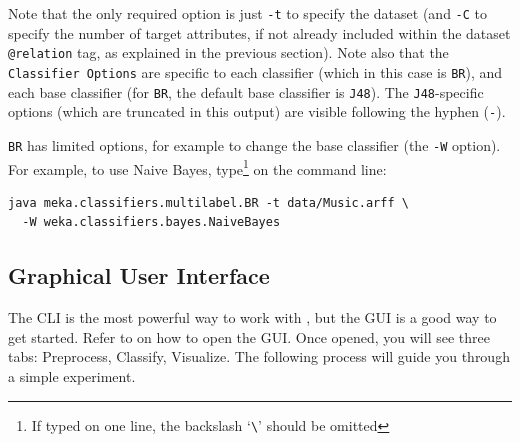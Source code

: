 \documentclass[11pt]{article}
\newcommand{\MEKA}{Meka}
\begin{document}
\begin{center}

\end{center}

Note that the only required option is just \texttt{-t} to specify the dataset (and \texttt{-C} to specify the number of target attributes, if not already included within the dataset \texttt{@relation} tag, as explained in the previous section). Note also that the \texttt{Classifier Options} are specific to each classifier (which in this case is \texttt{BR}), and each base classifier (for \texttt{BR}, the default base classifier is \texttt{J48}). The \texttt{J48}-specific options (which are truncated in this output) are visible following the hyphen (\texttt{-}). 

\texttt{BR} has limited options, for example to change the base classifier (the \texttt{-W} option). For example, to use Naive Bayes, type\footnote{If typed on one line, the backslash `\texttt{\textbackslash}' should be omitted} on the command line:

\begin{lstlisting}
java meka.classifiers.multilabel.BR -t data/Music.arff \
  -W weka.classifiers.bayes.NaiveBayes
\end{lstlisting}

\subsection{Graphical User Interface}

The CLI is the most powerful way to work with \framework{\MEKA}, but the GUI is a good way to get started. Refer to  on how to open the GUI. Once opened, you will see three tabs: \textsf{Preprocess}, \textsf{Classify}, \textsf{Visualize}. The following process will guide you through a simple experiment.
\end{document}

